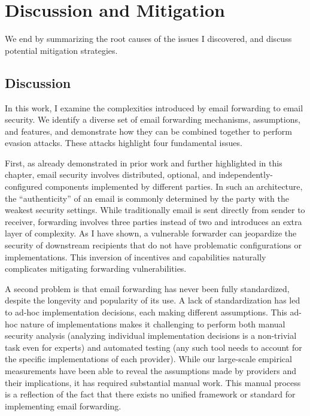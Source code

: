\section{Discussion and Mitigation}
We end by summarizing the root causes of the issues I discovered, and discuss potential mitigation strategies.

\subsection{Discussion}
In this work, I examine the complexities introduced by email forwarding to email security. We identify a diverse set of email forwarding mechanisms, assumptions, and features, and demonstrate how they can be combined together to perform evasion attacks. These attacks highlight four fundamental issues.

First, as already demonstrated in prior work and further highlighted in this chapter, email security involves distributed, optional, and independently-configured components implemented by different parties. In such an architecture, the
``authenticity'' of an email is commonly determined by the party with the weakest security settings. While traditionally email is sent directly from sender to receiver, forwarding involves three parties instead of two and introduces an extra layer of complexity. As I have shown, a vulnerable forwarder can jeopardize the security of downstream recipients that do not have problematic configurations or implementations. This inversion of
incentives and capabilities naturally complicates
mitigating forwarding vulnerabilities.

A second problem is that email forwarding has never been fully standardized, despite the longevity and popularity of its use. A lack of standardization has led to ad-hoc implementation decisions, each making different assumptions.
This ad-hoc nature of implementations makes it challenging to perform both manual security analysis (analyzing individual implementation decisions is a non-trivial task even for experts) and automated testing (any such tool needs to account for the specific implementations of each provider).
While our large-scale empirical measurements have been able to reveal
the assumptions made by providers and their implications, it has
required substantial manual work.  This manual process is a reflection
of the fact that there exists no unified framework or standard for
implementing email forwarding.


